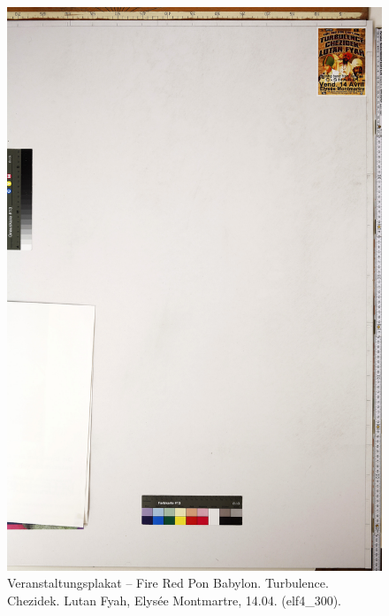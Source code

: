 \documentclass[a4paper,12pt,ngerman]{article}
\begin{document}
\newpage
\begin{figure}[ht]
\includegraphics[width=\linewidth]{Abbildung_53_(elf4_300)}
\centering
\caption{Veranstaltungsplakat – Fire Red Pon Babylon. Turbulence. Chezidek. Lutan Fyah, Elysée Montmartre, 14.04. (elf4\_300).}
\end{figure}
\end{document}
